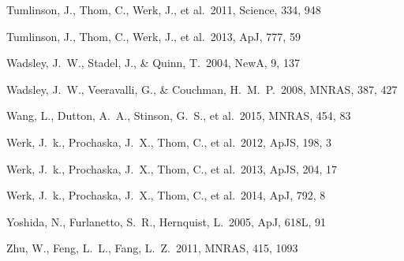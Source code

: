 \documentclass[useAMS,usenatbib]{mn2e}
\def \apj {ApJ}
\def \mnras {MNRAS}
\def \apjs {ApJS}
\def \na {NewA}
\begin{document}
\begin{thebibliography}{}
 Tumlinson, J., Thom, C., Werk, J., et al.\ 2011, Science, 334, 948

 Tumlinson, J., Thom, C., Werk, J., et al.\ 2013, \apj, 777, 59





 Wadsley, J.~W., Stadel, 
J., \& Quinn, T.\ 2004, \na, 9, 137 

 Wadsley, J.~W., 
Veeravalli, G., \& Couchman, H.~M.~P.\ 2008, \mnras, 387, 427 

 Wang, L., Dutton, A.~A.,  Stinson, G.~S., et al.\ 2015, \mnras, 454, 83
  
 Werk, J.~k., Prochaska, J.~X., Thom, C., et al.\ 2012, \apjs, 198, 3

 Werk, J.~k., Prochaska, J.~X., Thom, C., et al.\ 2013, \apjs, 204, 17

 Werk, J.~k., Prochaska, J.~X., Thom, C., et al.\ 2014, \apj, 792, 8



Yoshida, N., Furlanetto, S.~R., Hernquist, L.\ 2005, \apj, 618L, 91


 Zhu, W., Feng, L.~L., Fang, L.~Z.\ 2011, \mnras, 415, 1093

\end{thebibliography}

\label{lastpage}
\end{document}
